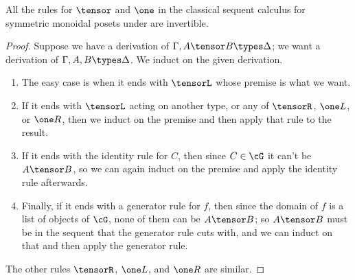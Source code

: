 \begin{thm}\label{thm:seqcalc-smpos-invertible}
  All the rules for $\tensor$ and $\one$ in the classical sequent calculus for symmetric monoidal posets under \cG are invertible.
\end{thm}
\begin{proof}
  Suppose we have a derivation of $\Gamma,A\tensor B\types \Delta$; we want a derivation of $\Gamma,A,B\types \Delta$.
  We induct on the given derivation.
  \begin{enumerate}
  \item The easy case is when it ends with $\tensorL$ whose premise is what we want.
  \item If it ends with $\tensorL$ acting on another type, or any of $\tensorR$, $\one L$, or $\one R$, then we induct on the premise and then apply that rule to the result.
  \item If it ends with the identity rule for $C$, then since $C\in \cG$ it can't be $A\tensor B$, so we can again induct on the premise and apply the identity rule afterwards.
  \item Finally, if it ends with a generator rule for $f$, then since the domain of $f$ is a list of objects of $\cG$, none of them can be $A\tensor B$; so $A\tensor B$ must be in the sequent that the generator rule cuts with, and we can induct on that and then apply the generator rule.
  \end{enumerate}
  The other rules $\tensorR$, $\one L$, and $\one R$ are similar.
\end{proof}

